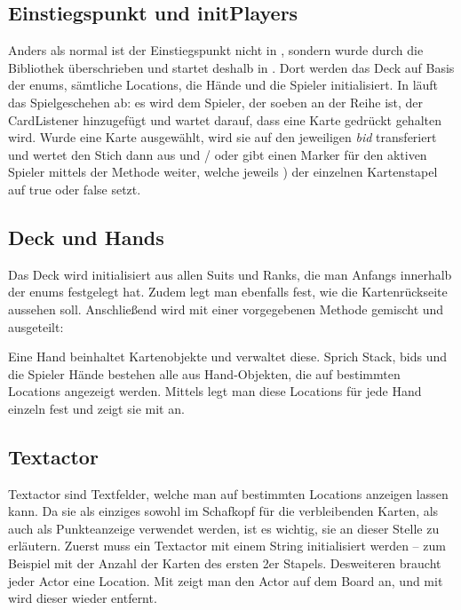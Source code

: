 \subsection{Einstiegspunkt und initPlayers}

Anders als normal ist der Einstiegspunkt nicht in , sondern
wurde durch die Bibliothek überschrieben und startet deshalb in .
Dort werden das Deck auf Basis der enums, sämtliche Locations, die Hände und
die Spieler initialisiert. In  läuft das Spielgeschehen ab:
es wird dem Spieler, der soeben an der Reihe ist, der CardListener hinzugefügt
und  wartet darauf, dass eine Karte gedrückt
gehalten wird. Wurde eine Karte ausgewählt, wird sie auf den jeweiligen
\emph{bid} transferiert und  wertet den Stich dann aus und
/ oder gibt einen Marker für den aktiven Spieler mittels der Methode
 weiter, welche jeweils
) der einzelnen Kartenstapel auf true oder false setzt.

\subsection{Deck und Hands}

Das Deck wird initialisiert aus allen Suits und Ranks, die man Anfangs
innerhalb der enums festgelegt hat. Zudem legt man ebenfalls fest, wie die
Kartenrückseite aussehen soll. Anschließend wird mit einer vorgegebenen Methode
gemischt und ausgeteilt:


Eine Hand beinhaltet Kartenobjekte und verwaltet diese. Sprich Stack, bids und
die Spieler Hände bestehen alle aus Hand-Objekten, die auf bestimmten Locations
angezeigt werden. Mittels  legt man diese Locations für jede Hand einzeln
fest und zeigt sie mit  an.

\subsection{Textactor}

Textactor sind Textfelder, welche man auf bestimmten Locations anzeigen lassen
kann. Da sie als einziges sowohl im Schafkopf für die verbleibenden Karten, als
auch als Punkteanzeige verwendet werden, ist es wichtig, sie an dieser Stelle
zu erläutern. Zuerst muss ein Textactor mit einem String initialisiert werden
-- zum Beispiel mit der Anzahl der Karten des ersten 2er Stapels. Desweiteren
braucht jeder Actor eine Location. Mit 
zeigt man den Actor auf dem Board an, und mit 
wird dieser wieder entfernt.


